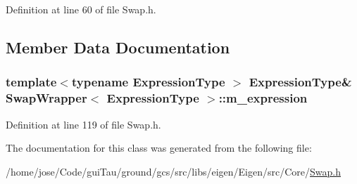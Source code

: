 Definition at line 60 of file Swap.\-h.



\subsection{Member Data Documentation}
\hypertarget{class_swap_wrapper_acf4d8e44d721d62c81ffc1d1d9745a3e}{
\subsubsection[{m\-\_\-expression}]{\setlength{\rightskip}{0pt plus 5cm}template$<$typename Expression\-Type $>$ Expression\-Type\& {\bf Swap\-Wrapper}$<$ Expression\-Type $>$\-::m\-\_\-expression\hspace{0.3cm}{\ttfamily [protected]}}}\label{class_swap_wrapper_acf4d8e44d721d62c81ffc1d1d9745a3e}


Definition at line 119 of file Swap.\-h.



The documentation for this class was generated from the following file\-:\begin{DoxyCompactItemize}
\item 
/home/jose/\-Code/gui\-Tau/ground/gcs/src/libs/eigen/\-Eigen/src/\-Core/\hyperlink{_swap_8h}{Swap.\-h}\end{DoxyCompactItemize}
